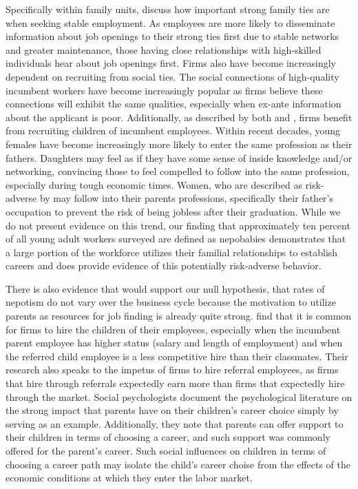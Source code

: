 \documentclass[12pt]{article}
\begin{document}
Specifically within family units, \cite{kramarz_when_2014} discuss how important strong family ties are when seeking stable employment. As employees are more likely to disseminate information about job openings to their strong ties first due to stable networks and greater maintenance, those having close relationships with high-skilled individuals hear about job openings first. Firms also have become increasingly dependent on recruiting from social ties. The social connections of high-quality incumbent workers have become increasingly popular as firms believe these connections will exhibit the same qualities, especially when ex-ante information about the applicant is poor. Additionally, as described by both \cite{kramarz_when_2014} and \cite{hellerstein_dads_2011}, firms benefit from recruiting children of incumbent employees. Within recent decades, young females have become increasingly more likely to enter the same profession as their fathers. Daughters may feel as if they have some sense of inside knowledge and/or networking, convincing those to feel compelled to follow into the same profession, especially during tough economic times. Women, who are described as risk-adverse by \cite{hellerstein_dads_2011} may follow into their parents professions, specifically their father’s occupation to prevent the risk of being jobless after their graduation. While we do not present evidence on this trend, our finding that approximately ten percent of all young adult workers surveyed are defined as nepobabies demonstrates that a large portion of the workforce utilizes their familial relationships to establish careers and does provide evidence of this potentially risk-adverse behavior.

There is also evidence that would support our null hypothesis, that rates of nepotism do not vary over the business cycle because the motivation to utilize parents as resources for job finding is already quite strong. \cite{kramarz2006nepotism} find that it is common for firms to hire the children of their employees, especially when the incumbent parent employee has higher status (salary and length of employment) and when the referred child employee is a less competitive hire than  their classmates. Their research also speaks to the impetus of firms to hire referral employees, as firms that hire through referrals expectedly earn more than firms that expectedly hire through the market. Social psychologists \cite{vanhooft_nepotism_2011} document the psychological literature on the strong impact that parents have on their children's career choice simply by serving as an example. Additionally, they note that parents can offer support to their children in terms of choosing a career, and such support was commonly offered for the parent's career. Such social influences on children in terms of choosing a career path may isolate the child's career choise from the effects of the economic conditions at which they enter the labor market.
\end{document}
